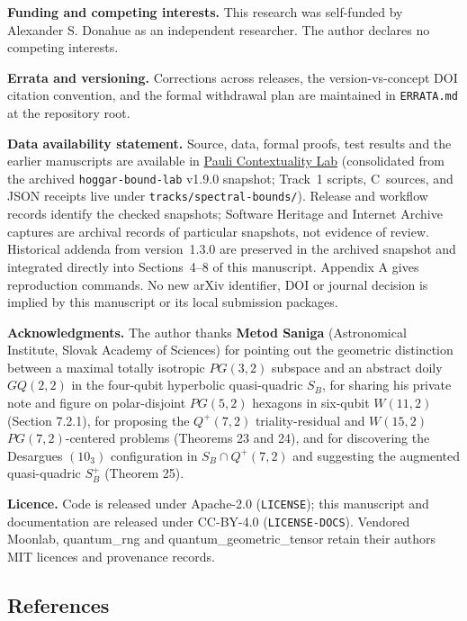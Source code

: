 \documentclass[11pt,a4paper]{article}
\begin{document}
\textbf{Funding and competing interests.} This research was self-funded by Alexander S. Donahue as an independent researcher.
The author declares no competing interests.

\textbf{Errata and versioning.} Corrections across releases, the version-vs-concept DOI citation convention, and the formal withdrawal plan are maintained in \texttt{ERRATA.md} at the repository root.

\textbf{Data availability statement.} Source, data, formal proofs, test results and the earlier manuscripts
are available in \href{https://github.com/0thernes/pauli-contextuality-lab}{Pauli Contextuality Lab} (consolidated from the archived \texttt{hoggar-bound-lab} v1.9.0 snapshot; Track~1 scripts, C~sources, and JSON receipts live under \texttt{tracks/spectral-bounds/}). Release and workflow
records identify the checked snapshots; Software Heritage and Internet Archive captures are archival
records of particular snapshots, not evidence of review. Historical addenda from version~1.3.0 are
preserved in the archived snapshot and integrated directly into Sections~4--8 of this manuscript.
Appendix A gives reproduction commands. No new arXiv identifier, DOI or journal decision is implied
by this manuscript or its local submission packages.

\textbf{Acknowledgments.} The author thanks \textbf{Metod Saniga} (Astronomical Institute, Slovak Academy of Sciences) for pointing out the geometric distinction between a maximal totally isotropic \(PG(3,2)\) subspace and an abstract doily \(GQ(2,2)\) in the four-qubit hyperbolic quasi-quadric \(S_B\), for sharing his private note and figure on polar-disjoint \(PG(5,2)\) hexagons in six-qubit \(W(11,2)\) (Section 7.2.1), for proposing the \(Q^+(7,2)\) triality-residual and \(W(15,2)\) \(PG(7,2)\)-centered problems (Theorems 23 and 24), and for discovering the Desargues \((10_3)\) configuration in \(S_B \cap Q^+(7,2)\) and suggesting the augmented quasi-quadric \(S_B^+\) (Theorem 25).

\textbf{Licence.} Code is released under Apache-2.0 (\texttt{LICENSE}); this manuscript and documentation are
released under CC-BY-4.0 (\texttt{LICENSE-DOCS}). Vendored Moonlab, quantum\_rng and
quantum\_geometric\_tensor retain their authors\textquotesingle{} MIT licences and provenance records.

\subsection{References}\label{references}
\end{document}
